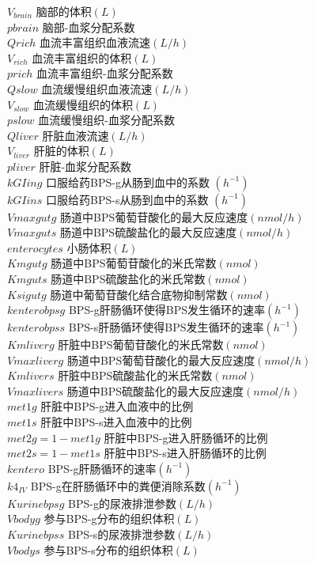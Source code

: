 \documentclass[a4paper,punct=banjiao,twoside]{ctexrep}
\theoremstyle{plain}
\theoremstyle{definition}
\theoremstyle{remark}
\begin{document}
$V_{brain}$ {\hfill  脑部的体积$(L)$}\\
$ pbrain$ {\hfill  脑部-血浆分配系数}\\
$ Qrich$ {\hfill  血流丰富组织血液流速$(L/h) $}\\
$V_{rich}$ {\hfill  血流丰富组织的体积$(L)$}\\
$ prich$ {\hfill  血流丰富组织-血浆分配系数}\\
$ Qslow$ {\hfill  血流缓慢组织血液流速$(L/h) $}\\
$V_{slow}$ {\hfill  血流缓慢组织的体积$(L)$}\\
$ pslow$ {\hfill  血流缓慢组织-血浆分配系数}\\
$ Qliver$ {\hfill  肝脏血液流速$(L/h) $}\\
$V_{liver}$ {\hfill  肝脏的体积$(L)$}\\
$ pliver$ {\hfill  肝脏-血浆分配系数}\\
$kGIing$ {\hfill 口服给药BPS-g从肠到血中的系数 $(h^{-1})$}\\
$kGIins $ {\hfill  口服给药BPS-s从肠到血中的系数 $(h^{-1})$}\\
$Vmaxgutg$ {\hfill  肠道中BPS葡萄苷酸化的最大反应速度$(nmol/h)$}\\
$Vmaxguts$ {\hfill  肠道中BPS硫酸盐化的最大反应速度$(nmol/h)$}\\
$enterocytes $ {\hfill  小肠体积$(L)$}\\
$ Kmgutg$ {\hfill  肠道中BPS葡萄苷酸化的米氏常数$(nmol)$}\\
$ Kmguts$ {\hfill  肠道中BPS硫酸盐化的米氏常数$(nmol)$}\\
$ Ksigutg$ {\hfill  肠道中葡萄苷酸化结合底物抑制常数$(nmol)$}\\
$ kenterobpsg$ {\hfill  BPS-g肝肠循环使得BPS发生循环的速率$(h^{-1})$}\\
$ kenterobpss$ {\hfill  BPS-s肝肠循环使得BPS发生循环的速率$(h^{-1})$}\\
$ Kmliverg$ {\hfill  肝脏中BPS葡萄苷酸化的米氏常数$(nmol)$}\\
$Vmaxliverg$ {\hfill  肠道中BPS葡萄苷酸化的最大反应速度$(nmol/h)$}\\
$ Kmlivers$ {\hfill  肝脏中BPS硫酸盐化的米氏常数$(nmol)$}\\
$Vmaxlivers$ {\hfill  肠道中BPS硫酸盐化的最大反应速度$(nmol/h)$}\\
$met1g $ {\hfill  肝脏中BPS-g进入血液中的比例}\\
$ met1s$ {\hfill  肝脏中BPS-s进入血液中的比例}\\
$met2g = 1 -  met1g$ {\hfill  肝脏中BPS-g进入肝肠循环的比例}\\
$ met2s= 1 -  met1s$ {\hfill  肝脏中BPS-s进入肝肠循环的比例}\\
$ kentero$ {\hfill  BPS-g肝肠循环的速率$(h^{-1})$}\\
$k4_{IV} $ {\hfill  BPS-g在肝肠循环中的粪便消除系数$(h^{-1})$}\\
$ Kurinebpsg$ {\hfill  BPS-g的尿液排泄参数$(L/h)$}\\
$Vbodyg  $ {\hfill  参与BPS-g分布的组织体积$(L)$}\\
$ Kurinebpss$ {\hfill  BPS-s的尿液排泄参数$(L/h)$}\\
$ Vbodys$ {\hfill  参与BPS-s分布的组织体积$(L)$}
\end{document}
